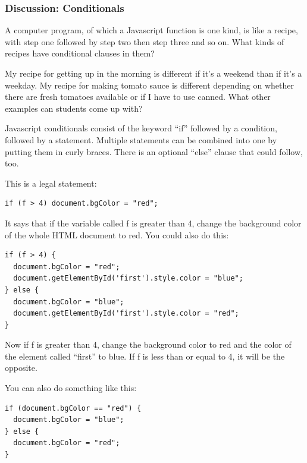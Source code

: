 \documentclass[11pt]{article}
\begin{document}
\subsubsection{Discussion: Conditionals}

A computer program, of which a Javascript function is one kind, is
like a recipe, with step one followed by step two then step three and
so on.  What kinds of recipes have conditional clauses in them?

My recipe for getting up in the morning is different if it's a weekend
than if it's a weekday.  My recipe for making tomato sauce is
different depending on whether there are fresh tomatoes available or
if I have to use canned.  What other examples can students come up with?

Javascript conditionals consist of the keyword ``if'' followed by a
condition, followed by a statement.  Multiple statements can be
combined into one by putting them in curly braces.  There is an
optional ``else'' clause that could follow, too.

This is a legal statement:

\begin{verbatim}
if (f > 4) document.bgColor = "red";
\end{verbatim}

It says that if the variable called f is greater than 4, change the
background color of the whole HTML document to red.  You could also do
this:

\begin{verbatim}
if (f > 4) {
  document.bgColor = "red";
  document.getElementById('first').style.color = "blue";
} else {
  document.bgColor = "blue";
  document.getElementById('first').style.color = "red";
}
\end{verbatim}

Now if f is greater than 4, change the background color to red and the
color of the element called ``first'' to blue.  If f is less than or
equal to 4, it will be the opposite.

You can also do something like this:

\begin{verbatim}
if (document.bgColor == "red") {
  document.bgColor = "blue";
} else {
  document.bgColor = "red";
}
\end{verbatim}
\end{document}
